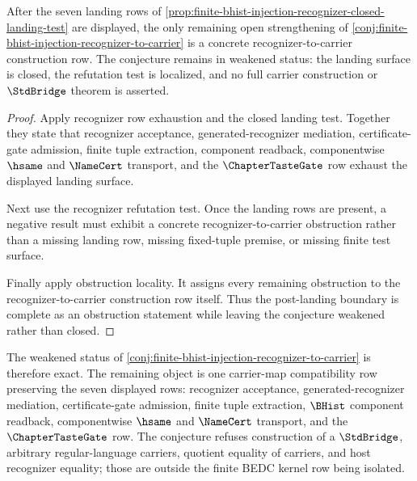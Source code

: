 \begin{theorem}
\label{thm:finite-bhist-injection-recognizer-carrier-obstruction-completeness}
After the seven landing rows of \autoref{prop:finite-bhist-injection-recognizer-closed-landing-test} are displayed, the only remaining open strengthening of \autoref{conj:finite-bhist-injection-recognizer-to-carrier} is a concrete recognizer-to-carrier construction row. The conjecture remains in weakened status: the landing surface is closed, the refutation test is localized, and no full carrier construction or $\StdBridge$ theorem is asserted.
\end{theorem}
\begin{proof}
Apply recognizer row exhaustion and the closed landing test. Together they state that recognizer acceptance, generated-recognizer mediation, certificate-gate admission, finite tuple extraction, component readback, componentwise $\hsame$ and $\NameCert$ transport, and the $\ChapterTasteGate$ row exhaust the displayed landing surface.

Next use the recognizer refutation test. Once the landing rows are present, a negative result must exhibit a concrete recognizer-to-carrier obstruction rather than a missing landing row, missing fixed-tuple premise, or missing finite test surface.

Finally apply obstruction locality. It assigns every remaining obstruction to the recognizer-to-carrier construction row itself. Thus the post-landing boundary is complete as an obstruction statement while leaving the conjecture weakened rather than closed.
\end{proof}

The weakened status of \autoref{conj:finite-bhist-injection-recognizer-to-carrier} is therefore exact. The remaining object is one carrier-map compatibility row preserving the seven displayed rows: recognizer acceptance, generated-recognizer mediation, certificate-gate admission, finite tuple extraction, $\BHist$ component readback, componentwise $\hsame$ and $\NameCert$ transport, and the $\ChapterTasteGate$ row. The conjecture refuses construction of a $\StdBridge$, arbitrary regular-language carriers, quotient equality of carriers, and host recognizer equality; those are outside the finite BEDC kernel row being isolated.



